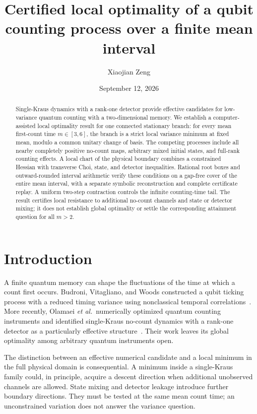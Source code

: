 \documentclass[aps,pra,reprint,amsmath,amssymb,longbibliography]{revtex4-2}
\begin{document}
\title{Certified local optimality of a qubit counting process over a finite mean interval}
\author{Xiaojian Zeng}
\date{September 12, 2026}
\begin{abstract}
Single-Kraus dynamics with a rank-one detector provide effective candidates for low-variance quantum counting with a two-dimensional memory. We establish a computer-assisted local optimality result for one connected stationary branch: for every mean first-count time $m\in[3,6]$, the branch is a strict local variance minimum at fixed mean, modulo a common unitary change of basis. The competing processes include all nearby completely positive no-count maps, arbitrary mixed initial states, and full-rank counting effects. A local chart of the physical boundary combines a constrained Hessian with transverse Choi, state, and detector inequalities. Rational root boxes and outward-rounded interval arithmetic verify these conditions on a gap-free cover of the entire mean interval, with a separate symbolic reconstruction and complete certificate replay. A uniform two-step contraction controls the infinite counting-time tail. The result certifies local resistance to additional no-count channels and state or detector mixing; it does not establish global optimality or settle the corresponding attainment question for all $m>2$.
\end{abstract}
\maketitle

\section{Introduction}
A finite quantum memory can shape the fluctuations of the time at which a count first occurs. Budroni, Vitagliano, and Woods constructed a qubit ticking process with a reduced timing variance using nonclassical temporal correlations~\cite{Budroni2021}. More recently, Olamaei \textit{et al.}\ numerically optimized quantum counting instruments and identified single-Kraus no-count dynamics with a rank-one detector as a particularly effective structure~\cite{Olamaei2026}. Their work leaves its global optimality among arbitrary quantum instruments open.

The distinction between an effective numerical candidate and a local minimum in the full physical domain is consequential. A minimum inside a single-Kraus family could, in principle, acquire a descent direction when additional unobserved channels are allowed. State mixing and detector leakage introduce further boundary directions. They must be tested at the same mean count time; an unconstrained variation does not answer the variance question.
\end{document}
